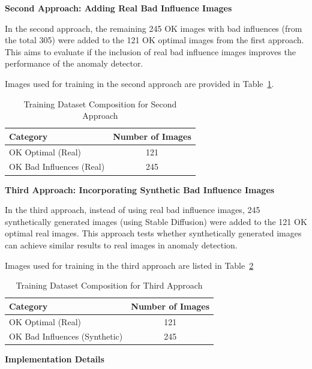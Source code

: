 \documentclass[12pt,DIV14,BCOR12mm,a4paper,footinclude=false,headinclude,parskip=half-,twoside,openright,cleardoublepage=empty,toc=index,bibliography=totoc,listof=totoc]{scrreprt}
\numberwithin{equation}{chapter}
\begin{document}
\textbf{Second Approach: Adding Real Bad Influence Images}

In the second approach, the remaining 245 OK images with bad influences (from the total 305) were added to the 121 OK optimal images from the first approach. This aims to evaluate if the inclusion of real bad influence images improves the performance of the anomaly detector.

Images used for training in the second approach are provided in Table~\ref{tab:second-approach}.

\begin{table} 
    \centering
    \caption{Training Dataset Composition for Second Approach}
    \label{tab:second-approach}
    \begin{tabular}{lc} %
        \toprule
        \textbf{Category} & \textbf{Number of Images} \\ 
        \midrule
        OK Optimal (Real) & 121 \\ 
        OK Bad Influences (Real) & 245 \\ 
        \bottomrule
    \end{tabular}
\end{table}


\textbf{Third Approach: Incorporating Synthetic Bad Influence Images}

In the third approach, instead of using real bad influence images, 245 synthetically generated images (using Stable Diffusion) were added to the 121 OK optimal real images. This approach tests whether synthetically generated images can achieve similar results to real images in anomaly detection.

Images used for training in the third approach are listed in Table~\ref{tab:third-approach}

\begin{table} 
    \centering
    \caption{Training Dataset Composition for Third Approach}
    \label{tab:third-approach}
    \begin{tabular}{lc} %
        \toprule
        \textbf{Category} & \textbf{Number of Images} \\ 
        \midrule
        OK Optimal (Real) & 121 \\ 
        OK Bad Influences (Synthetic) & 245 \\ 
        \bottomrule
    \end{tabular}
\end{table}

\textbf{Implementation Details}
\end{document}
